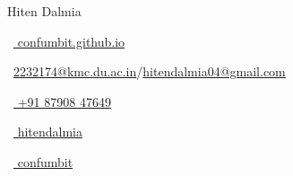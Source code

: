 \vspace*{-0.10em}
\begin{Large}
	Hiten Dalmia
\end{Large}

\begin{footnotesize}
	\begin{tiny}\faHome\end{tiny}~\href{https://confumbit.github.io/}{
		confumbit.github.io
	}
	\quad \begin{tiny}\faEnvelope[regular]\end{tiny}~\href{mailto:2232174@kmc.du.ac.in}{2232174@kmc.du.ac.in}/\href{mailto:hitendalmia04@gmail.com}{hitendalmia04@gmail.com}

	\begin{tiny}\faMobile*\end{tiny}~\href{tel:918790847649}{
		+91 87908 47649
	}
	\quad
	\begin{tiny}\faLinkedinIn\end{tiny}~\href{https://www.linkedin.com/in/hitendalmia/}{
		hitendalmia
	}
	\quad
	\begin{tiny}\faGithub\end{tiny}~\href{https://github.com/confumbit/ }{
		confumbit
	}

\end{footnotesize}
